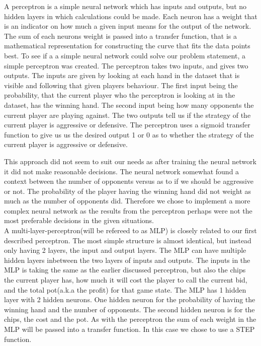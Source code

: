 A perceptron is a simple neural network which has inputs and outputs, but no hidden layers in which calculations could be made. Each neuron has a weight that is an indicator on how much a given input means for the output of the network. The sum of each neurons weight is passed into a transfer function, that is a mathematical representation for constructing the curve that fits the data points best.
To see if a a simple neural network could solve our problem statement, a simple perceptron was created. The perceptron takes two inputs, and gives two outputs. The inputs are given by looking at each hand in the dataset that is visible and following that given players behaviour.
The first input being the probability, that the current player who the perceptron is looking at in the dataset, has the winning hand. The second input being how many opponents the current player are playing against. 
The two outputs tell us if the strategy of the current player is aggressive or defensive. 
The perceptron uses a sigmoid transfer function to give us us the desired output 1 or 0 as to whether the strategy of the current player is aggressive or defensive.

This approach did not seem to suit our needs as after training the neural network it did not make reasonable decisions. The neural network somewhat found a context between the number of opponents versus as to if we should be aggressive or not. The probability of the player having the winning hand did not weight as much as the number of opponents did. Therefore we chose to implement a more complex neural network as the results from the perceptron perhaps were not the most preferable decisions in the given situations.\\


A multi-layer-perceptron(will be refereed to as MLP) is closely related to our first described perceptron. The most simple structure is almost identical, but instead only having 2 layers, the input and output layers. The MLP can have multiple hidden layers inbetween the two layers of inputs and outputs.
The inputs in the MLP is taking the same as the earlier discussed perceptron, but also the chips the current player has, how much it will cost the player to call the current bid, and the total pot(a.k.a the profit) for that game state.
The MLP has 1 hidden layer with 2 hidden neurons. One hidden neuron for the probability of having the winning hand and the number of opponents. The second hidden neuron is for the chips, the cost and the pot.
As with the perceptron the sum of each weight in the MLP will be passed into a transfer function. In this case we chose to use a STEP function.

